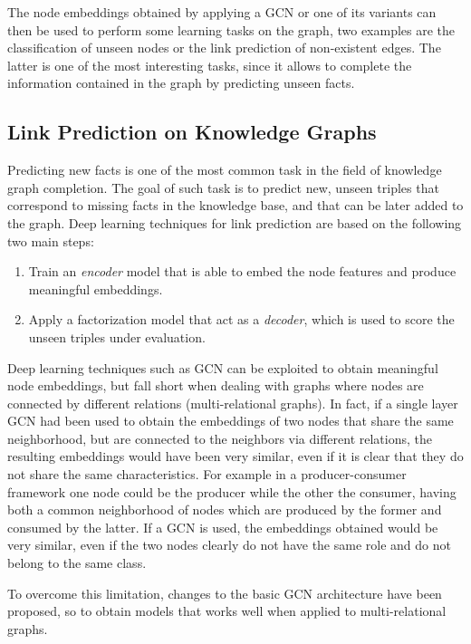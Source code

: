 \documentclass[%
    corpo=13.5pt,
    twoside,
    oldstyle,
    tipotesi=magistrale,
    greek,
    evenboxes
]{toptesi}
\begin{document}
The node embeddings obtained by applying a GCN or one of its variants can
then be used to perform some learning tasks on the graph, two examples are
the classification of unseen nodes or the link prediction of non-existent
edges. The latter is one of the most interesting tasks, since it allows to
complete the information contained in the graph by predicting unseen facts.

\subsection{Link Prediction on Knowledge Graphs}
\label{subsec:linkprediction}

Predicting new facts is one of the most common task in the field
of knowledge graph completion. The goal of such task is to predict new, unseen
triples that correspond to missing facts in the knowledge base, and that can be
later added to the graph.
Deep learning techniques for link prediction are based on the following two
main steps:

\begin{enumerate}
    \item Train an \emph{encoder} model
    that is able to embed the node features and produce meaningful embeddings.
    \item Apply a factorization model that act as a \emph{decoder}, which is
    used to score the unseen triples under evaluation.
\end{enumerate}

Deep learning techniques such as GCN can be exploited to obtain meaningful
node embeddings, but fall short when dealing with graphs where
nodes are connected by different relations (multi-relational graphs).
In fact, if a single layer GCN had been used to obtain the embeddings of two nodes
that share the same neighborhood, but are connected to the neighbors via
different relations, the resulting embeddings would have been very similar, even if it is
clear that they do not share the same characteristics. For example in a
producer-consumer framework one node could be the producer while the other
the consumer, having both a common neighborhood of nodes
which are produced by the former and consumed by the latter.
If a GCN is used, the embeddings obtained would be very similar, even if
the two nodes clearly do not have the same role and do not belong to the
same class.

To overcome this limitation, changes to the basic GCN architecture have been
proposed, so to obtain models that works well when applied to multi-relational
graphs.
\newline
\end{document}
